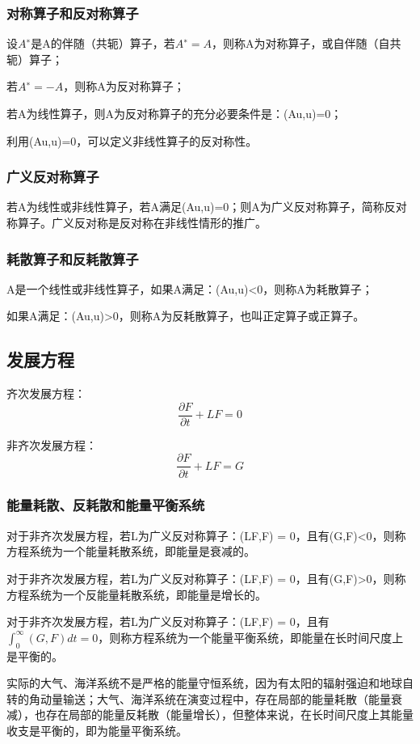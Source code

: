 \documentclass{article}
\begin{document}
\subsubsection{对称算子和反对称算子}
设$A^∗$是A的伴随（共轭）算子，若$A^∗=A$，则称A为对称算子，或自伴随（自共轭）算子；

若$A^∗=−A$，则称A为反对称算子；

若A为线性算子，则A为反对称算子的充分必要条件是：(Au,u)=0；

利用(Au,u)=0，可以定义非线性算子的反对称性。

\subsubsection{广义反对称算子}
若A为线性或非线性算子，若A满足(Au,u)=0；则A为广义反对称算子，简称反对称算子。广义反对称是反对称在非线性情形的推广。

\subsubsection{耗散算子和反耗散算子}
A是一个线性或非线性算子，如果A满足：(Au,u)<0，则称A为耗散算子；

如果A满足：(Au,u)>0，则称A为反耗散算子，也叫正定算子或正算子。

\subsection{发展方程}
齐次发展方程：
$$\frac{\partial F}{\partial t} + LF = 0$$

非齐次发展方程：
$$\frac{\partial F}{\partial t} + LF = G$$

\subsubsection{能量耗散、反耗散和能量平衡系统}
对于非齐次发展方程，若L为广义反对称算子：(LF,F) = 0，且有(G,F)<0，则称方程系统为一个能量耗散系统，即能量是衰减的。

对于非齐次发展方程，若L为广义反对称算子：(LF,F) = 0，且有(G,F)>0，则称方程系统为一个反能量耗散系统，即能量是增长的。

对于非齐次发展方程，若L为广义反对称算子：(LF,F) = 0，且有$\int_0^\infty(G,F)dt=0$，则称方程系统为一个能量平衡系统，即能量在长时间尺度上是平衡的。

实际的大气、海洋系统不是严格的能量守恒系统，因为有太阳的辐射强迫和地球自转的角动量输送；大气、海洋系统在演变过程中，存在局部的能量耗散（能量衰减），也存在局部的能量反耗散（能量增长），但整体来说，在长时间尺度上其能量收支是平衡的，即为能量平衡系统。
\end{document}
